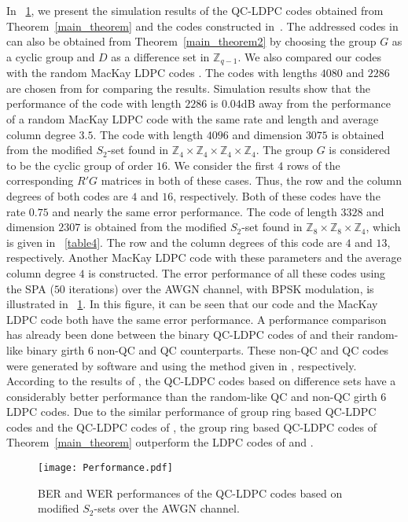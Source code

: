 \documentclass[journal,draftclsnofoot,onecolumn,12pt,twoside]{IEEEtran}
\begin{document}
In \figurename~\ref{figsim1}, we present the simulation results of the QC-LDPC codes obtained from Theorem~\ref{main_theorem} and the  codes constructed in~\cite{15}.
The addressed codes in \cite{15} can also be obtained from Theorem~\ref{main_theorem2} by choosing the group $G$ as a cyclic group and $D$ as a difference set in $\mathbb{Z}_{q-1}$.
We also compared our codes with the random MacKay LDPC codes \cite{38}.
The codes with lengths $4080$ and $2286$ are chosen from  \cite{15} for comparing the results. Simulation results show that the performance of the code with length $2286$ is $0.04$dB away from the performance of a random MacKay LDPC code with the same rate and length and average column degree $3.5$.      The code with length $4096$ and dimension $3075$ is obtained from the modified $S_2$-set found in $\mathbb{Z}_4\times \mathbb{Z}_4\times \mathbb{Z}_4\times \mathbb{Z}_4$. The group $G$ is considered to be the cyclic group of order $16$. We consider the first $4$ rows of the corresponding $R'G$ matrices in both of these cases. Thus, the row and the column degrees of both codes are $4$ and $16$, respectively. Both  of these codes have the rate $0.75$ and nearly the same error performance. The code of length $3328$ and dimension $2307$ is obtained from the modified $S_2$-set  found in $\mathbb{Z}_8\times \mathbb{Z}_8\times \mathbb{Z}_4$, which is given in \tablename~\ref{table4}. The row and the column degrees of this code are $4$ and $13$, respectively.
Another MacKay LDPC code with these parameters and the average column degree $4$ is constructed.  The error performance of all these codes using the SPA ($50$ iterations) over the AWGN channel, with BPSK modulation, is illustrated in \figurename~\ref{figsim1}.
In this figure, it can be seen  that our code and the MacKay LDPC code both have the same error performance.
A performance comparison has already been done between the binary QC-LDPC codes of \cite{15} and their random-like binary girth $6$ non-QC and QC counterparts. These non-QC and QC codes were generated by software \cite{36} and using the method given in \cite{35}, respectively. According to the results of \cite{15}, the QC-LDPC codes based on difference sets have a considerably better performance than the random-like QC and non-QC girth $6$ LDPC codes. Due to the similar performance of group ring based QC-LDPC codes and the QC-LDPC codes of \cite{15}, the group ring based QC-LDPC codes of Theorem~\ref{main_theorem} outperform the LDPC codes of \cite{36} and \cite{35}.
\begin{figure}[!h]
\centering
\texttt{[image: Performance.pdf]}
\caption{BER and WER performances of the QC-LDPC codes based on modified $S_2$-sets over the AWGN channel.}
\label{figsim1}
\end{figure}
\end{document}

